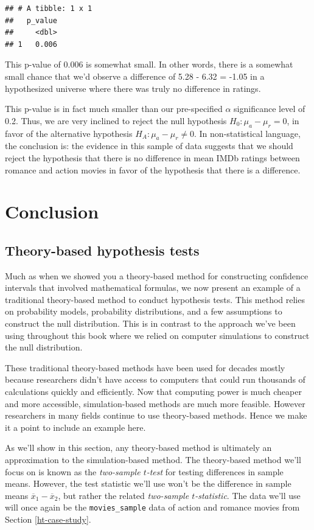 \documentclass[
]{book}
\begin{document}
\begin{verbatim}
## # A tibble: 1 x 1
##   p_value
##     <dbl>
## 1   0.006
\end{verbatim}

This p-value of 0.006 is somewhat small. In other words, there is a somewhat small chance that we'd observe a difference of 5.28 - 6.32 = -1.05 in a hypothesized universe where there was truly no difference in ratings.

This p-value is in fact much smaller than our pre-specified \(\alpha\) significance level of 0.2. Thus, we are very inclined to reject the null hypothesis \(H_0: \mu_a - \mu_r = 0\), in favor of the alternative hypothesis \(H_A: \mu_a - \mu_r \neq 0\). In non-statistical language, the conclusion is: the evidence in this sample of data suggests that we should reject the hypothesis that there is no difference in mean IMDb ratings between romance and action movies in favor of the hypothesis that there is a difference.

\hypertarget{conclusion}{%
\section{Conclusion}\label{conclusion}}

\hypertarget{theory-hypo}{%
\subsection{Theory-based hypothesis tests}\label{theory-hypo}}

Much as when we showed you a theory-based method for constructing confidence intervals that involved mathematical formulas, we now present an example of a traditional theory-based method to conduct hypothesis tests. This method relies on probability models, probability distributions, and a few assumptions to construct the null distribution. This is in contrast to the approach we've been using throughout this book where we relied on computer simulations to construct the null distribution.

These traditional theory-based methods have been used for decades mostly because researchers didn't have access to computers that could run thousands of calculations quickly and efficiently. Now that computing power is much cheaper and more accessible, simulation-based methods are much more feasible. However researchers in many fields continue to use theory-based methods. Hence we make it a point to include an example here.

As we'll show in this section, any theory-based method is ultimately an approximation to the simulation-based method. The theory-based method we'll focus on is known as the \emph{two-sample \(t\)-test} for testing differences in sample means. However, the test statistic we'll use won't be the difference in sample means \(\overline{x}_1 - \overline{x}_2\), but rather the related \emph{two-sample \(t\)-statistic}. The data we'll use will once again be the \texttt{movies\_sample} data of action and romance movies from Section \ref{ht-case-study}.
\end{document}
